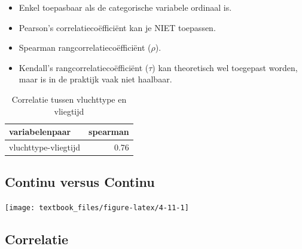 \documentclass[]{tufte-book}
\providecommand{\tightlist}{%
  \setlength{\itemsep}{0pt}\setlength{\parskip}{0pt}}
\begin{document}
\begin{itemize}
\tightlist
\item
  Enkel toepasbaar als de categorische variabele ordinaal is.
\item
  Pearson's correlatiecoëfficiënt kan je NIET toepassen.
\item
  Spearman rangcorrelatiecoëfficiënt (\(\rho\)).
\item
  Kendall's rangcorrelatiecoëfficiënt (\(\tau\)) kan theoretisch wel toegepast worden, maar is in de praktijk vaak niet haalbaar.
\end{itemize}

\begin{table}

\caption{\label{tab:unnamed-chunk-73}Correlatie tussen vluchttype en vliegtijd}
\centering
\fontsize{10}{12}\selectfont
\begin{tabular}[t]{lr}
\toprule
variabelenpaar & spearman\\
\midrule
vluchttype-vliegtijd & 0.76\\
\bottomrule
\end{tabular}
\end{table}

\hypertarget{continu-versus-continu}{%
\subsection{Continu versus Continu}\label{continu-versus-continu}}

\texttt{[image: textbook\_files/figure-latex/4-11-1]}

\hypertarget{correlatie-1}{%
\subsection*{Correlatie}\label{correlatie-1}}
\end{document}
